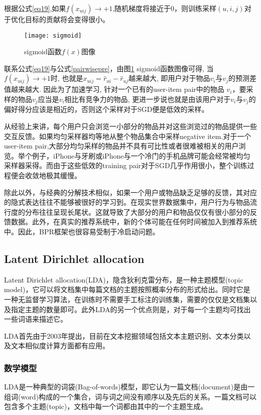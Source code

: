 根据公式\eqref{eq19},如果$f \left(x_{uij}\right) \rightarrow +1$,随机梯度将接近于0，则训练采样$\left(u,i,j\right)$对于优化目标的贡献将会变得很小。
\begin{figure}[htbp]
	\begin{center}
		\texttt{[image: sigmoid]}
		\caption{sigmoid函数$f \left(x\right) $图像}
		\label{gra-sigmoid}
	\end{center}
\end{figure}

联系公式\eqref{eq19}与公式\eqref{pairwisepre}，由图\ref{gra-sigmoid} sigmoid函数图像可得, 当$f \left(x_{uij}\right) \rightarrow +1$时, 也就是$x_{uij} = \hat{r}_{ui} - \hat{r}_{uj}$越来越大, 即用户对于物品$v_i$与$v_j$的预测差值越来越大. 因此为了加速学习, 针对一个已有的user-item pair中的物品 $v_i$，要采样的物品$v_j$应当是$v_i$相比有竞争力的物品, 更进一步说也就是由该用户对于$v_i$与$v_j$的偏好得分应该是相近的，否则这个采样对于SGD便是低效的采样。

从经验上来讲，每个用户只会浏览一小部分的物品并对这些浏览过的物品提供一些交互反馈。如果均匀采样器均等地从整个物品集合中采样negative  item.对于一个user-item  pair,大部分均匀采样的物品并不具有可比性或者很难被相关的用户浏览。举个例子，iPhone与牙刷或iPhone与一个冷门的手机品牌可能会经常被均匀采样器采得。而由于这些低效的training pair对于SGD几乎作用很小，整个训练过程便会收敛地极其缓慢。

除此以外，与经典的分解技术相似，如果一个用户或物品缺乏足够的反馈，其对应的隐式表达往往不能够被很好的学习到。在现实世界数据集中，用户行为与物品流行度的分布往往呈现长尾状。这就导致了大部分的用户和物品仅仅有很小部分的反馈数据。此外，在真实的推荐系统中，新的个体可能在任何时间被加入到推荐系统中。因此，BPR框架也很容易受制于冷启动问题。

\subsection{Latent Dirichlet allocation}
Latent Dirichlet allocation(LDA)，隐含狄利克雷分布，是一种主题模型(topic model)，它可以将文档集中每篇文档的主题按照概率分布的形式给出。同时它是一种无监督学习算法，在训练时不需要手工标注的训练集，需要的仅仅是文档集以及指定主题的数量即可。此外LDA的另一个优点则是，对于每一个主题均可找出一些词语来描述它。

LDA首先由于2003年提出\cite{blei2003latent}，目前在文本挖掘领域包括文本主题识别、文本分类以及文本相似度计算方面都有应用。


\subsubsection{数学模型}
LDA是一种典型的词袋(Bag-of-words)模型，即它认为一篇文档(document)是由一组词(word)构成的一个集合，词与词之间没有顺序以及先后的关系。一篇文档可以包含多个主题(topic)，文档中每一个词都由其中的一个主题生成。

